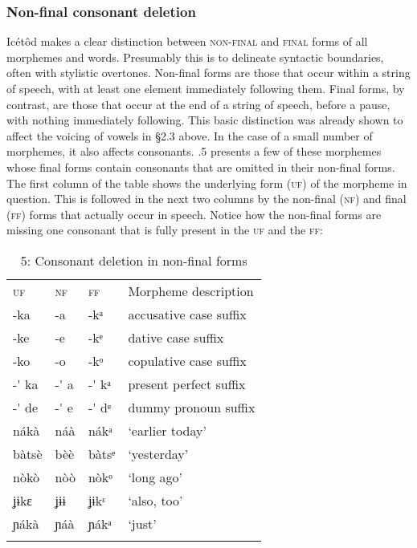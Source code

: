 \subsubsection{Non-final consonant deletion}

Icétôd makes a clear distinction between \textsc{non-final} and \textsc{final} forms of all morphemes and words. Presumably this is to delineate syntactic boundaries, often with stylistic overtones. Non-final forms are those that occur within a string of speech, with at least one element immediately following them. Final forms, by contrast, are those that occur at the end of a string of speech, before a pause, with nothing immediately following. This basic distinction was already shown to affect the voicing of vowels in §2.3 above. In the case of a small number of morphemes, it also affects consonants. .5 presents a few of these morphemes whose final forms contain consonants that are omitted in their non-final forms. The first column of the table shows the underlying form (\textsc{uf}) of the morpheme in question. This is followed in the next two columns by the non-final (\textsc{nf}) and final (\textsc{ff}) forms that actually occur in speech. Notice how the non-final forms are missing one consonant that is fully present in the \textsc{uf} and the \textsc{ff}:


\begin{table}
\caption{5: Consonant deletion in non-final forms}
\label{tab:2}


\begin{tabularx}{\textwidth}{XXXX}
\lsptoprule

\textsc{uf} & \textsc{nf} & \textsc{ff} & Morpheme description\\
{}-ka & {}-a & {}-kᵃ & accusative case suffix\\
{}-ke & {}-e & {}-kᵉ & dative case suffix\\
{}-ko & {}-o & {}-kᵒ & copulative case suffix\\
{}-\'{} ka & {}-\'{} a & {}-\'{} kᵃ & present perfect suffix\\
{}-\'{} de & {}-\'{} e & {}-\'{} dᵉ & dummy pronoun suffix\\
nákà & náà & nákᵃ & ‘earlier today’\\
bàtsè & bèè & bàtsᵉ & ‘yesterday’\\
nòkò & nòò & nòkᵒ & ‘long ago’\\
ʝɨkɛ & ʝɨɨ & ʝɨkᵋ & ‘also, too’\\
ɲákà & ɲáà & ɲákᵃ & ‘just’\\
\lspbottomrule
\end{tabularx}
\end{table}


